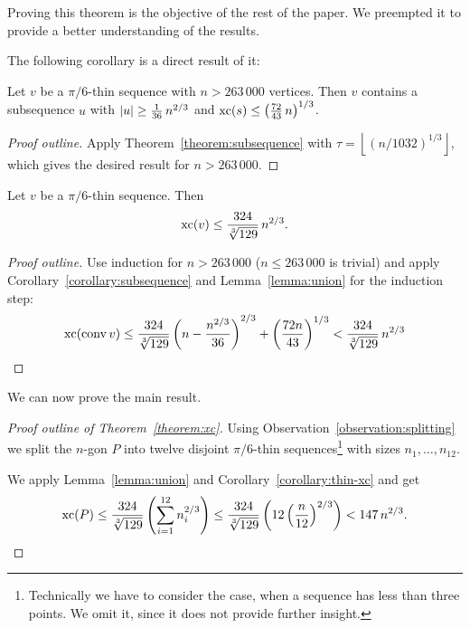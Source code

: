 Proving this theorem is the objective of the rest of the paper. We preempted it to provide a better understanding of the results.

The following corollary is a direct result of it: 

\begin{corollary}\label{corollary:subsequence}
  Let $v$ be a $\pi/6$-thin sequence with $n > 263\,000$ vertices. 
  Then $v$ contains a subsequence $u$ with $\lvert u\rvert \geq \frac{1}{36}\,n^{2/3}$ and $\operatorname{xc}(s) \leq \left( \frac{72}{43}\,n \right)^{1/3}$.
\end{corollary}

\begin{proof}[Proof outline]
  Apply Theorem~\ref{theorem:subsequence} with $\tau=\left\lfloor (n/1032)^{1/3} \right\rfloor$, which gives the desired result for $n > 263\,000$.
\end{proof}

\begin{corollary}\label{corollary:thin-xc}
  Let $v$ be a $\pi/6$-thin sequence. Then $$\operatorname{xc}(v) \leq \frac{324}{\sqrt[3]{129}}\,n^{2/3} .$$
\end{corollary}

\begin{proof}[Proof outline]
  Use induction for $n > 263\,000$ ($n \leq 263\,000$ is trivial) and apply Corollary~\ref{corollary:subsequence} and Lemma~\ref{lemma:union} for the induction step: $$\operatorname{xc}(\operatorname{conv} v) \leq \frac{324}{\sqrt[3]{129}} \left(n-\frac{n^{2/3}}{36}\right)^{2/3}+\left(\frac{72n}{43}\right)^{1/3} < \frac{324}{\sqrt[3]{129}}\,n^{2/3}$$
\end{proof}

We can now prove the main result.

\begin{proof}[Proof outline of Theorem~\ref{theorem:xc}]
  Using Observation~\ref{observation:splitting} we split the $n$-gon $P$ into twelve disjoint $\pi/6$-thin sequences\footnote{Technically we have to consider the case, when a sequence has less than three points. We omit it, since it does not provide further insight.} with sizes $n_1,\dots,n_{12}$.

  We apply Lemma~\ref{lemma:union} and Corollary~\ref{corollary:thin-xc} and get $$\operatorname{xc}(P)\leq\frac{324}{\sqrt[3]{129}}\left(\sum\limits_{i=1}^{12}n_i^{2/3}\right)\leq\frac{324}{\sqrt[3]{129}}\left(12\left(\frac{n}{12}\right)^{2/3}\right) < 147\,n^{2/3} .$$
\end{proof}



